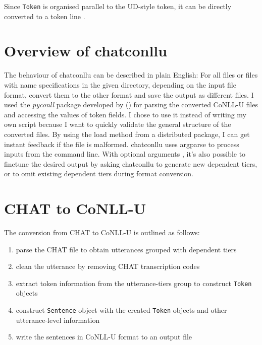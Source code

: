 Since \texttt{Token} is organised parallel to the UD-style token, it can be directly converted to a token line .

\section{Overview of chatconllu}

The behaviour of chatconllu can be described in plain English: For all files or files with name specifications in the given directory, depending on the input file format, convert them to the other format and save the output as different files. I used the \emph{pyconll}  package developed by (\cite{pyconll}) for parsing the converted CoNLL-U files and accessing the values of token fields. I chose to use it instead of writing my own script because I want to quickly validate the general structure of the converted files. By using the load method from a distributed package, I can get instant feedback if the file is malformed. chatconllu uses argparse to process inputs from the command line. With optional arguments , it's also possible to finetune the desired output by asking chatconllu to generate new dependent tiers, or to omit existing dependent tiers during format conversion.

\section{CHAT to CoNLL-U}

The conversion from CHAT to CoNLL-U is outlined as follows:
\begin{enumerate}
	\item parse the CHAT file to obtain utterances grouped with dependent tiers
	\item clean the utterance by removing CHAT transcription codes
	\item extract token information from the utterance-tiers group to construct \texttt{Token} objects
	\item construct \texttt{Sentence} object with the created \texttt{Token} objects and other utterance-level information
	\item write the sentences in CoNLL-U format to an output file
\end{enumerate}

